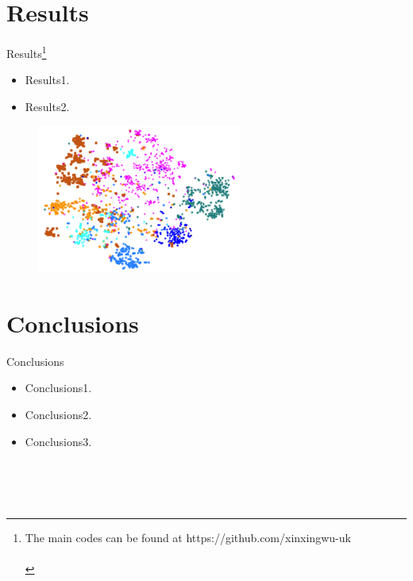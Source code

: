 \documentclass[11pt]{beamer}
\begin{document}
\section{Results}
\begin{frame}{Results{\footnote{The main codes can be found at \color{blue} https://github.com/xinxingwu-uk
\quad\\\quad\\}}}
\begin{itemize}
\item Results1.  
\item Results2.
\end{itemize}

\begin{figure}[t]
\begin{center}
\centerline{\includegraphics[width=0.6\textwidth]{./Figures/fig1.png}}
\end{center}
\label{fig:01}
\end{figure}

\end{frame}

\section{Conclusions}
\begin{frame}{Conclusions}
\begin{itemize}
[ball]
\item Conclusions1.
\item Conclusions2.
\item Conclusions3.
\end{itemize}

\end{frame}


\begin{frame}
\ \\ \ \\
\centering {\Huge \textcolor{darkred}{\bf Thank You}}\\

\end{frame}

 
\end{document}
